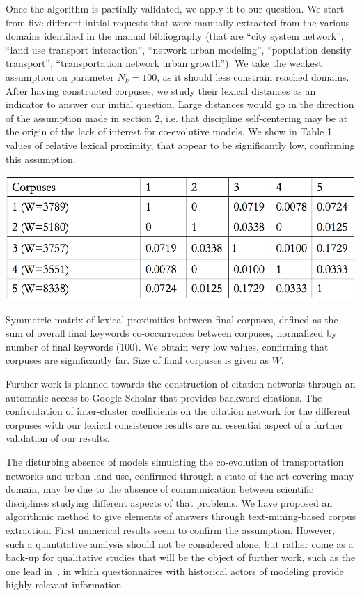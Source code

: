 Once the algorithm is partially validated, we apply it to our question. We start from five different initial requests that were manually extracted from the various domains identified in the manual bibliography (that are ``city system network'', ``land use transport interaction'', ``network urban modeling'', ``population density transport'', ``transportation network urban growth''). We take the weakest assumption on parameter $N_k=100$, as it should less  constrain reached domains. After having constructed corpuses, we study their lexical distances as an indicator to answer our initial question. Large distances would go in the direction of the assumption made in section 2, i.e. that discipline self-centering may be at the origin of the lack of interest for co-evolutive models. We show in Table 1 values of relative lexical proximity, that appear to be significantly low, confirming this assumption.


\begin{table}
\centering
\includegraphics[width=\textwidth]{Figures/PartI/QuantitativeEpistemo/corpusesDistances}
\caption[Stationary lexical proximities]{Symmetric matrix of lexical proximities between final corpuses, defined as the sum of overall final keywords co-occurrences between corpuses, normalized by number of final keywords (100). We obtain very low values, confirming that corpuses are significantly far. Size of final corpuses is given as $W$.}
\end{table}



Further work is planned towards the construction of citation networks through an automatic access to Google Scholar that provides backward citations. The confrontation of inter-cluster coefficients on the citation network for the different corpuses with our lexical consistence results are an essential aspect of a further validation of our results.


The disturbing absence of models simulating the co-evolution of transportation networks and urban land-use, confirmed through a state-of-the-art covering many domain, may be due to the absence of communication between scientific disciplines studying different aspects of that problems. We have proposed an algorithmic method to give elements of answers through text-mining-based corpus extraction. First numerical results seem to confirm the assumption. However, such a quantitative analysis  should not be considered alone, but rather come as a back-up for qualitative studies that will be the object of further work, such as the one lead in~\cite{commenges:tel-00923682}, in which questionnaires with historical actors of modeling provide highly relevant information.





